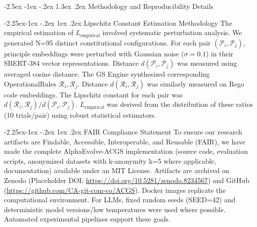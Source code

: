\documentclass[manuscript,screen,review,anonymous,9pt]{acmart}
\makeatletter
\renewcommand\section{\@startsection{section}{1}{\z@}%
  {-2.5ex \@plus -1ex \@minus -.2ex}%
  {1.3ex \@plus.2ex}%
  {\normalfont\Large\bfseries}}
\renewcommand\subsection{\@startsection{subsection}{2}{\z@}%
  {-2.25ex\@plus -1ex \@minus -.2ex}%
  {1ex \@plus .2ex}%
  {\normalfont\large\bfseries}}
\makeatother
\begin{document}
\section{Methodology and Reproducibility Details}
\label{app:methodology}

\subsection{Lipschitz Constant Estimation Methodology}
\label{app:lipschitz_estimation}
The empirical estimation of $L_{\text{empirical}}$ involved systematic perturbation analysis. We generated N=95 distinct constitutional configurations. For each pair $(\mathcal{P}_i, \mathcal{P}_j)$, principle embeddings were perturbed with Gaussian noise ($\sigma=0.1$) in their SBERT-384 vector representations. Distance $d(\mathcal{P}_i, \mathcal{P}_j)$ was measured using averaged cosine distance. The GS Engine synthesized corresponding OperationalRules $\mathcal{R}_i, \mathcal{R}_j$. Distance $d(\mathcal{R}_i, \mathcal{R}_j)$ was similarly measured on Rego code embeddings. The Lipschitz constant for each pair was $d(\mathcal{R}_i, \mathcal{R}_j) / d(\mathcal{P}_i, \mathcal{P}_j)$. $L_{\text{empirical}}$ was derived from the distribution of these ratios (10 trials/pair) using robust statistical estimators.

\subsection{FAIR Compliance Statement}
\label{app:fair_compliance}
To ensure our research artifacts are Findable, Accessible, Interoperable, and Reusable (FAIR), we have made the complete AlphaEvolve-ACGS implementation (source code, evaluation scripts, anonymized datasets with k-anonymity k=5 where applicable, documentation) available under an MIT License. Artifacts are archived on Zenodo (Placeholder DOI: \url{https://doi.org/10.5281/zenodo.8234567}) and GitHub (\url{https://github.com/CA-git-com-co/ACGS}). Docker images replicate the computational environment. For LLMs, fixed random seeds (SEED=42) and deterministic model versions/low temperatures were used where possible. Automated experimental pipelines support these goals.
\end{document}
